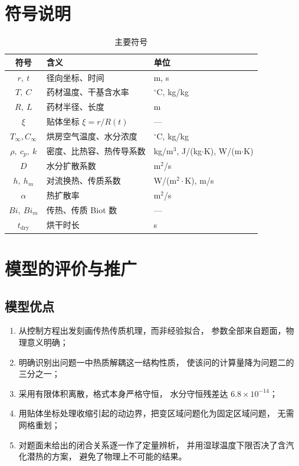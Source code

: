 \documentclass[12pt,a4paper]{ctexart}
\begin{document}
\section{符号说明}

\begin{table}[htbp]
  \centering
  \caption*{主要符号}
  \small
  \begin{tabular}{cll}
    \toprule
    符号 & 含义 & 单位 \\
    \midrule
    $r,\ t$            & 径向坐标、时间              & m, s \\
    $T,\ C$            & 药材温度、干基含水率        & $^\circ$C, kg/kg \\
    $R,\ L$            & 药材半径、长度              & m \\
    $\xi$              & 贴体坐标 $\xi=r/R(t)$       & --- \\
    $T_\infty,C_\infty$ & 烘房空气温度、水分浓度     & $^\circ$C, kg/kg \\
    $\rho,\ c_p,\ k$   & 密度、比热容、热传导系数    & kg/m$^3$, J/(kg$\cdot$K), W/(m$\cdot$K) \\
    $D$                & 水分扩散系数                & m$^2$/s \\
    $h,\ h_m$          & 对流换热、传质系数          & W/(m$^2\cdot$K), m/s \\
    $\alpha$           & 热扩散率                    & m$^2$/s \\
    $Bi,\ Bi_m$        & 传热、传质 Biot 数          & --- \\
    $t_{\mathrm{dry}}$ & 烘干时长                    & s \\
    \bottomrule
  \end{tabular}
\end{table}

\section{模型的评价与推广}

\subsection{模型优点}

\begin{enumerate}
  \item 从控制方程出发刻画传热传质机理，而非经验拟合，
        参数全部来自题面，物理意义明确；
  \item 明确识别出问题一中热质解耦这一结构性质，
        使该问的计算量降为问题二的三分之一；
  \item 采用有限体积离散，格式本身严格守恒，
        水分守恒残差达 $6.8\times10^{-14}$；
  \item 用贴体坐标处理收缩引起的动边界，把变区域问题化为固定区域问题，
        无需网格重划；
  \item 对题面未给出的闭合关系逐一作了定量辨析，
        并用湿球温度下限否决了含汽化潜热的方案，
        避免了物理上不可能的结果。
\end{enumerate}
\end{document}
